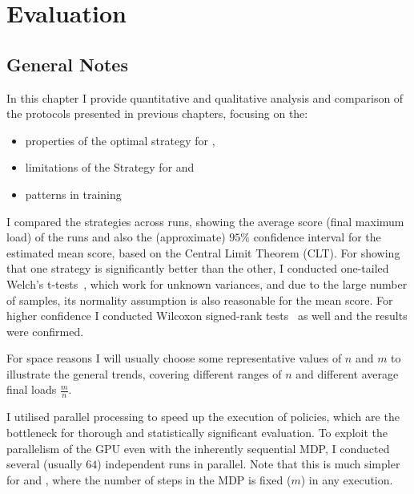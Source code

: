 \chapter{Evaluation}\label{evaluation}


\ifpdf
    \graphicspath{{Chapter3/Figs/Raster/}{Chapter3/Figs/PDF/}{Chapter3/Figs/}}
\else
    \graphicspath{{Chapter3/Figs/Vector/}{Chapter3/Figs/}}
\fi


\section{General Notes} \label{evaluationnotes}

In this chapter I provide quantitative and qualitative analysis and comparison of the protocols presented in previous chapters, focusing on the:

\begin{itemize}
    \item properties of the optimal \DP strategy for \TwoThinning,
    \item limitations of the \Greedy Strategy for \GraphicalTwoChoice and
    \item patterns in \DQL training
\end{itemize} 


I compared the strategies across \NumberofRuns runs, showing the average score (final maximum load) of the runs and also the (approximate) $95\%$ confidence interval for the estimated mean score, based on the Central Limit Theorem (CLT). For showing that one strategy is significantly better than the other, I conducted one-tailed Welch's t-tests~\cite{welch1947ttest}, which work for unknown variances, and due to the large number of samples, its normality assumption is also reasonable for the mean score. For higher confidence I conducted Wilcoxon signed-rank tests~\cite{wilcoxon1992test} as well and the results were confirmed.


For space reasons I will usually choose some representative values of $n$ and $m$ to illustrate the general trends, covering different ranges of $n$ and different average final loads $\frac{m}{n}$.


I utilised parallel processing to speed up the execution of \DQL policies, which are the bottleneck for thorough and statistically significant evaluation. To exploit the parallelism of the GPU even with the inherently sequential MDP, I conducted several (usually $64$) independent runs in parallel. Note that this is much simpler for \TwoThinning and \GraphicalTwoChoice, where the number of steps in the MDP is fixed ($m$) in any execution.


